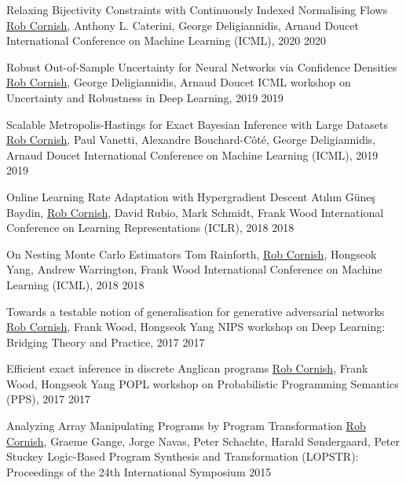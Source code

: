 \documentclass[9pt]{developercv} %
\begin{document}
\begin{entrylist}
    \publication
        {Relaxing Bijectivity Constraints with Continuously Indexed Normalising Flows}
        {\underline{Rob Cornish}, Anthony L. Caterini, George Deligiannidis, Arnaud Doucet}
        {International Conference on Machine Learning (ICML), 2020}
        {2020}

    \publication
        {Robust Out-of-Sample Uncertainty for Neural Networks via Confidence Densities}
        {\underline{Rob Cornish}, George Deligiannidis, Arnaud Doucet}
        {ICML workshop on Uncertainty and Robustness in Deep Learning, 2019}
        {2019}

    \publication
        {Scalable Metropolis-Hastings for Exact Bayesian Inference with Large Datasets}
        {\underline{Rob Cornish}, Paul Vanetti, Alexandre Bouchard-C\^ot\'e, George Deligiannidis, Arnaud Doucet}
        {International Conference on Machine Learning (ICML), 2019}
        {2019}

    \publication
        {Online Learning Rate Adaptation with Hypergradient Descent}
        {At\i l\i m G\"une\c s Baydin, \underline{Rob Cornish}, David Rubio, Mark Schmidt, Frank Wood}
        {International Conference on Learning Representations (ICLR), 2018}
        {2018}

    \publication
        {On Nesting Monte Carlo Estimators}
        {Tom Rainforth, \underline{Rob Cornish}, Hongseok Yang, Andrew Warrington, Frank Wood}
        {International Conference on Machine Learning (ICML), 2018}
        {2018}

    \publication
        {Towards a testable notion of generalisation for generative adversarial networks}
        {\underline{Rob Cornish}, Frank Wood, Hongseok Yang}
        {NIPS workshop on Deep Learning: Bridging Theory and Practice, 2017}
        {2017}

    \publication
        {Efficient exact inference in discrete Anglican programs}
        {\underline{Rob Cornish}, Frank Wood, Hongseok Yang}
        {POPL workshop on Probabilistic Programming Semantics (PPS), 2017}
        {2017}

    \publication
        {Analyzing Array Manipulating Programs by Program Transformation}
        {\underline{Rob Cornish}, Graeme Gange, Jorge Navas, Peter Schachte, Harald S\o ndergaard, Peter Stuckey}
        {Logic-Based Program Synthesis and Transformation (LOPSTR): Proceedings of the 24th International Symposium}
        {2015}
\end{entrylist}

\vspace{-1em}
\end{document}

